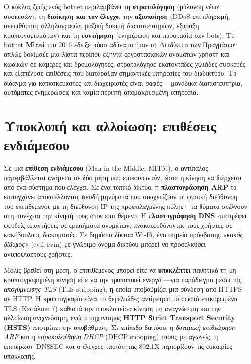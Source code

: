 Ο κύκλος ζωής ενός botnet περιλαμβάνει τη \textbf{στρατολόγηση} (μόλυνση νέων συσκευών), τη \textbf{διοίκηση και τον έλεγχο}, την \textbf{αξιοποίηση} (DDoS επί πληρωμή, ανεπιθύμητη αλληλογραφία, μαζική δοκιμή διαπιστευτηρίων, εξόρυξη κρυπτονομισμάτων) και τη \textbf{συντήρηση} (ενημέρωση και προστασία των bots). Το botnet \textbf{Mirai} του 2016 έδειξε πόσο αδύναμο ήταν το Διαδίκτυο των Πραγμάτων: απλώς δοκίμαζε μια λίστα περίπου εξήντα εργοστασιακών ονομάτων χρήστη και κωδικών σε κάμερες και δρομολογητές, στρατολόγησε εκατοντάδες χιλιάδες συσκευές και εξαπέλυσε επιθέσεις που διατάραξαν σημαντικές υπηρεσίες του διαδικτύου. Το δίδαγμα για κατασκευαστές και διαχειριστές είναι σαφές —μοναδικά διαπιστευτήρια, αυτόματες ενημερώσεις και καμία περιττή απομακρυσμένη υπηρεσία.

\section{Υποκλοπή και αλλοίωση: επιθέσεις ενδιάμεσου}\label{sec:6.3}
Σε μια \textbf{επίθεση ενδιάμεσου} (Man-in-the-Middle, MITM), ο αντίπαλος παρεμβάλλεται ανάμεσα σε δύο μέρη που επικοινωνούν, ώστε η κίνηση να διέρχεται από ένα σύστημα που ελέγχει. Σε ένα τοπικό δίκτυο, η \textbf{πλαστογράφηση ARP} το επιτυγχάνει αποστέλλοντας ψευδή μηνύματα που συσχετίζουν τη φυσική διεύθυνση του επιτιθέμενου με τη διεύθυνση IP της προεπιλεγμένης πύλης· τα θύματα στέλνουν στη συνέχεια την κίνησή τους στον επιτιθέμενο. Η \textbf{πλαστογράφηση DNS} επιστρέφει ψευδείς απαντήσεις σε ερωτήματα ονομάτων, ανακατευθύνοντας τους χρήστες σε κακόβουλους διακομιστές. Σε δημόσια δίκτυα Wi-Fi, ένα σημείο πρόσβασης \emph{«κακός δίδυμος»} (evil twin) με γνώριμο όνομα δικτύου μπορεί να προσελκύσει ανυποψίαστους χρήστες.

Μόλις βρεθεί στη μέση, ο επιτιθέμενος μπορεί είτε να \textbf{υποκλέπτει} παθητικά τη μη κρυπτογραφημένη κίνηση είτε να την τροποποιεί ενεργά —για παράδειγμα μέσω της \emph{απογύμνωσης TLS} (TLS stripping), η οποία υποβαθμίζει μια σύνδεση από HTTPS σε HTTP. Η κρυπτογραφία είναι το θεμελιώδες αντίμετρο: το σωστά επικυρωμένο TLS (Κεφάλαιο 7) καθιστά την υποκλαπείσα κίνηση μη αναγνώσιμη και την αλλοίωση ανιχνεύσιμη, ενώ ο μηχανισμός \textbf{HTTP Strict Transport Security (HSTS)} αποτρέπει την υποβάθμιση. Σε επίπεδο δικτύου, η \emph{δυναμική επιθεώρηση ARP} και η \emph{παρακολούθηση DHCP} (DHCP snooping) στους μεταγωγείς, η επικύρωση DNSSEC και ο έλεγχος ταυτότητας 802.1X περιορίζουν τις ευκαιρίες υποκλοπής.

